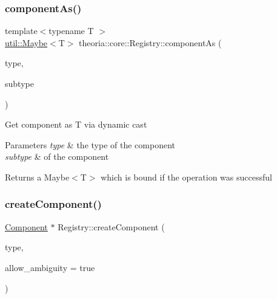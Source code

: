 \subsubsection{\texorpdfstring{component\+As()}{componentAs()}\hspace{0.1cm}{\footnotesize\ttfamily [3/3]}}
{\footnotesize\ttfamily template$<$typename T $>$ \\
\hyperlink{classtheoria_1_1util_1_1Maybe}{util\+::\+Maybe}$<$T$>$ theoria\+::core\+::\+Registry\+::component\+As (\begin{DoxyParamCaption}\item[{const Type\+Name \&}]{type,  }\item[{const Sub\+Type\+Name \&}]{subtype }\end{DoxyParamCaption})\hspace{0.3cm}{\ttfamily [inline]}}

Get component as T via dynamic cast 
\begin{DoxyParams}{Parameters}
{\em type} & the type of the component \\
\hline
{\em subtype} & of the component \\
\hline
\end{DoxyParams}
\begin{DoxyReturn}{Returns}
a Maybe$<$\+T$>$ which is bound if the operation was successful 
\end{DoxyReturn}
\mbox{\label{classtheoria_1_1core_1_1Registry_a846b6ea01b2c4d3d1276796e9ef2b32b}} 
\subsubsection{\texorpdfstring{create\+Component()}{createComponent()}\hspace{0.1cm}{\footnotesize\ttfamily [1/3]}}
{\footnotesize\ttfamily \hyperlink{classtheoria_1_1core_1_1Component}{Component} $\ast$ Registry\+::create\+Component (\begin{DoxyParamCaption}\item[{const Type\+Name \&}]{type,  }\item[{int}]{allow\+\_\+ambiguity = {\ttfamily true} }\end{DoxyParamCaption})}

